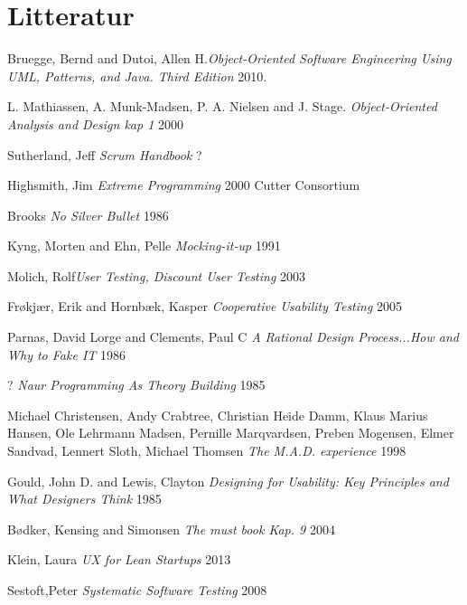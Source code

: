 \documentclass[12pt]{article}
\begin{document}
\section{Litteratur}
\begingroup
\renewcommand{\section}[2]{}%
  \begin{thebibliography}{1}
   Bruegge, Bernd and Dutoi, Allen H.{\em Object-Oriented Software Engineering Using UML, Patterns, and Java. Third Edition}  2010.

    L. Mathiassen, A. Munk-Madsen, P. A. Nielsen and J. Stage. {\em Object-Oriented Analysis and Design kap 1} 2000

   Sutherland, Jeff {\em Scrum Handbook} ?
  
   Highsmith, Jim {\em Extreme Programming} 2000 Cutter Consortium

   Brooks {\em No Silver Bullet
  } 1986

   Kyng, Morten and Ehn, Pelle {\em Mocking-it-up} 1991
  
   Molich, Rolf{\em User Testing, Discount User Testing} 2003

   Frøkjær, Erik and Hornbæk, Kasper {\em Cooperative Usability Testing} 2005
  
   Parnas, David Lorge and Clements, Paul C {\em A Rational Design Process...How and Why to Fake IT} 1986
    
   ? {\em Naur Programming As Theory Building} 1985
      
   Michael Christensen, Andy Crabtree, Christian Heide Damm, Klaus Marius
Hansen, Ole Lehrmann Madsen, Pernille Marqvardsen, Preben Mogensen, Elmer
Sandvad, Lennert Sloth, Michael Thomsen {\em The M.A.D. experience} 1998
   
   Gould, John D. and Lewis, Clayton {\em Designing for Usability:
Key Principles and
What Designers Think} 1985

   Bødker, Kensing and Simonsen {\em The must book Kap. 9} 2004
      
   Klein, Laura {\em UX for Lean Startups} 2013
            
   Sestoft,Peter  {\em Systematic Software Testing} 2008
      
  \end{thebibliography}
  \endgroup
\end{document}
